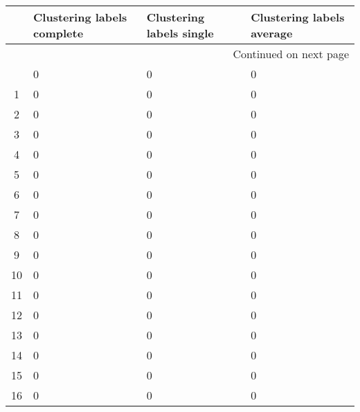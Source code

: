 \begin{longtable}{cp{1.5cm}p{1.5cm}p{1.5cm}}
\toprule
{} &  Clustering labels complete &  Clustering labels single &  Clustering labels average \\
\midrule
\endhead
\midrule
\multicolumn{4}{r}{{Continued on next page}} \\
\midrule
\endfoot

\bottomrule
\endlastfoot
0  &                           0 &                         0 &                          0 \\
1  &                           0 &                         0 &                          0 \\
2  &                           0 &                         0 &                          0 \\
3  &                           0 &                         0 &                          0 \\
4  &                           0 &                         0 &                          0 \\
5  &                           0 &                         0 &                          0 \\
6  &                           0 &                         0 &                          0 \\
7  &                           0 &                         0 &                          0 \\
8  &                           0 &                         0 &                          0 \\
9  &                           0 &                         0 &                          0 \\
10 &                           0 &                         0 &                          0 \\
11 &                           0 &                         0 &                          0 \\
12 &                           0 &                         0 &                          0 \\
13 &                           0 &                         0 &                          0 \\
14 &                           0 &                         0 &                          0 \\
15 &                           0 &                         0 &                          0 \\
16 &                           0 &                         0 &                          0 \\

\end{longtable}
